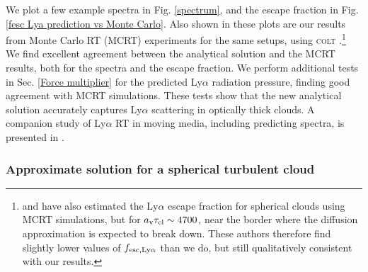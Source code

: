 \documentclass[fleqn,usenatbib]{mnras}
\newcommand{\taucl}{\tau_{\rm cl}}
\newcommand\HI{\ion{H}{I}\xspace} %
\begin{document}
We plot a few example spectra in Fig. \ref{spectrum}, and the escape fraction in Fig. \ref{fesc Lya prediction vs Monte Carlo}. Also shown in these plots are our results from Monte Carlo RT (MCRT) experiments for the same setups, using \textsc{colt} \citep[the Cosmic Lyman-$\alpha$ Transfer code,][]{Smith2015}.\footnote{\cite{ForeroRomero2011} and \cite{Garavito2014} have also estimated the Ly$\alpha$ escape fraction for spherical clouds using MCRT simulations, but for $a_{\rm v} \taucl \sim 4700$, near the border where the diffusion approximation is expected to break down. These authors therefore find slightly lower values of $f_{\rm esc, Ly\alpha}$ than we do, but still qualitatively consistent with our results.}
We find excellent agreement between the analytical solution and the MCRT results, both for the spectra and the escape fraction. We perform additional tests in Sec. \ref{Force multiplier} for the predicted Ly$\alpha$ radiation pressure, finding good agreement with MCRT simulations. These tests show that the new analytical solution accurately captures Ly$\alpha$ scattering in optically thick clouds. A companion study of Ly$\alpha$ RT in moving media, including predicting spectra, is presented in \cite{Smith2025}. 


\subsubsection{Approximate solution for a spherical turbulent \HI cloud}
\label{turbulent cloud solution section}
\end{document}
